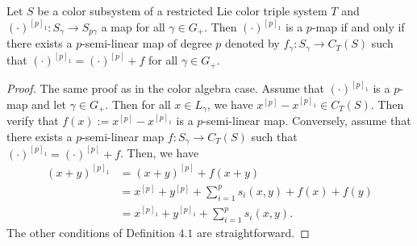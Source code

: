 \documentclass[11pt, twoside]{article}
\begin{document}
\begin{prop}\label{p4.17}
     Let $S$ be a color subsystem of a restricted Lie color triple system $T$ and $(\cdot)^{[p]_1}:S_\gamma\to S_{p\gamma} $ a map for all $\gamma\in G_+ $. Then $(\cdot)^{[p]_1} $ is a $p$-map if and only if there exists a $p$-semi-linear map of degree $p$ denoted by $f_\gamma:S_\gamma\to C_T(S)$ such that $(\cdot)^{[p]_1}=(\cdot)^{[p]}+f $ for all $\gamma\in G_+ $.
\end{prop}

\begin{proof}
    The same proof as in the color algebra case. Assume that $(\cdot)^{[p]_1} $ is a $p$-map and  let $\gamma\in G_+ $. Then for all $x\in L_\gamma$, we have $x^{[p]}-x^{[p]_1}\in C_T(S) $. Then  verify that $f(x):= x^{[p]}-x^{[p]_1} $ is a $p$-semi-linear map. Conversely, assume that there exists a $p$-semi-linear map $f: S_\gamma\to C_T(S)$ such that $(\cdot)^{[p]_1}= (\cdot)^{[p]}+ f $. Then, we have \begin{align*}
        (x+y)^{[p]_1} &= (x+y)^{[p]}+ f(x+y) \\ &= x^{[p]}+y^{[p]} + \sum\limits_{i=1}^p s_i(x,y) + f(x) +f(y) \\ & = x^{[p]_1}+y^{[p]_1} + \sum\limits_{i=1}^ps_i(x,y). 
    \end{align*} The other conditions of Definition $4.1$ are straightforward. 
\end{proof}
\end{document}
